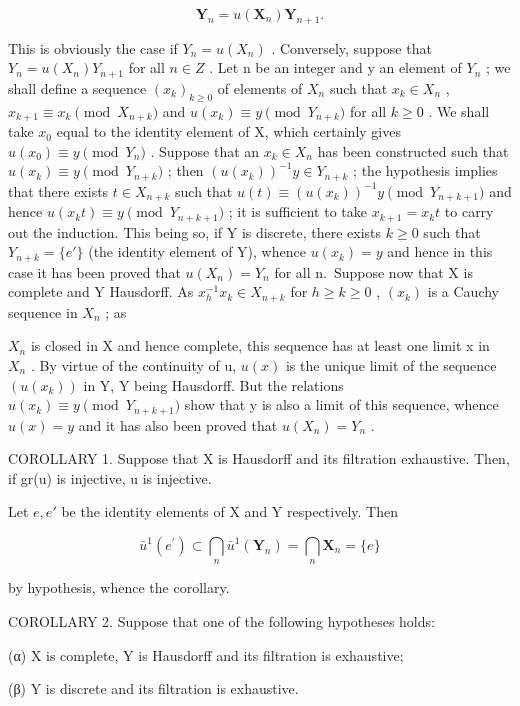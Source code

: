 \[
\mathbf {Y} _ {n} = u (\mathbf {X} _ {n}) \mathbf {Y} _ {n + 1}.
\]

This is obviously the case if \(Y_{n}=u(X_{n})\) . Conversely, suppose that \(Y_{n}=u(X_{n})Y_{n+1}\) for all \(n\in Z\) . Let n be an integer and y an element of \(Y_{n}\) ; we shall define a sequence \((x_{k})_{k\geq0}\) of elements of \(X_{n}\) such that \(x_{k}\in X_{n}\) , \(x_{k+1}\equiv x_{k} \pmod{X_{n+k}}\) and \(u(x_{k})\equiv y \pmod{Y_{n+k}}\) for all \(k\geq0\) . We shall take \(x_{0}\) equal to the identity element of X, which certainly gives \(u(x_{0})\equiv y \pmod{Y_{n}}\) . Suppose that an \(x_{k}\in X_{n}\) has been constructed such that \(u(x_{k})\equiv y \pmod{Y_{n+k}}\) ; then \((u(x_{k}))^{-1}y\in Y_{n+k}\) ; the hypothesis implies that there exists \(t\in X_{n+k}\) such that \(u(t)\equiv(u(x_{k}))^{-1}y \pmod{Y_{n+k+1}}\) and hence \(u(x_{k}t)\equiv y \pmod{Y_{n+k+1}}\) ; it is sufficient to take \(x_{k+1}=x_{k}t\) to carry out the induction. This being so, if Y is discrete, there exists \(k\geq0\) such that \(Y_{n+k}=\{e'\}\) (the identity element of Y), whence \(u(x_{k})=y\) and hence in this case it has been proved that \(u(X_{n})=Y_{n}\) for all n.~Suppose now that X is complete and Y Hausdorff. As \(x_{h}^{-1}x_{k}\in X_{n+k}\) for \(h\geq k\geq0\) , \((x_{k})\) is a Cauchy sequence in \(X_{n}\) ; as

\(X_{n}\) is closed in X and hence complete, this sequence has at least one limit x in \(X_{n}\) . By virtue of the continuity of u, \(u(x)\) is the unique limit of the sequence \((u(x_{k}))\) in Y, Y being Hausdorff. But the relations \(u(x_{k}) \equiv y \pmod{Y_{n+k+1}}\) show that y is also a limit of this sequence, whence \(u(x) = y\) and it has also been proved that \(u(X_{n}) = Y_{n}\) .

COROLLARY 1. Suppose that X is Hausdorff and its filtration exhaustive. Then, if gr(u) is injective, u is injective.

Let \(e, e'\) be the identity elements of X and Y respectively. Then

\[
\bar {u} ^ {1} (e ^ {\prime}) \subset \bigcap_ {n} \bar {u} ^ {1} (\mathbf {Y} _ {n}) = \bigcap_ {n} \mathbf {X} _ {n} = \{e \}
\]

by hypothesis, whence the corollary.

COROLLARY 2. Suppose that one of the following hypotheses holds:

(α) X is complete, Y is Hausdorff and its filtration is exhaustive;

(β) Y is discrete and its filtration is exhaustive.

